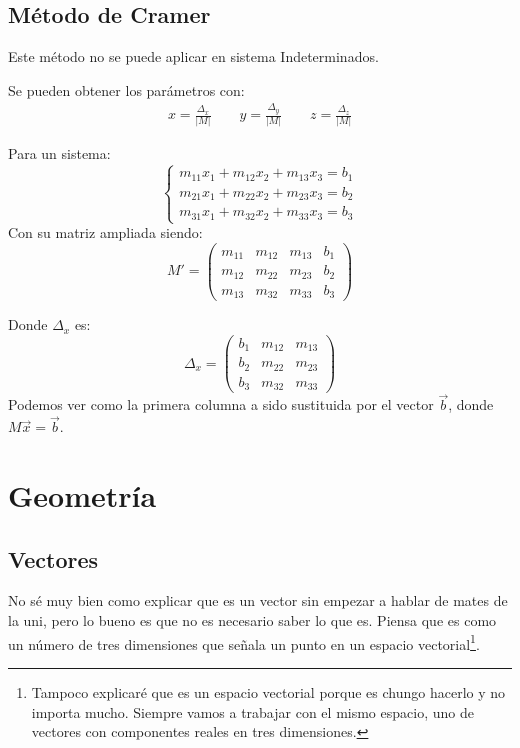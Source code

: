\documentclass[arial,a4paper,print]{article}
\begin{document}
\subsection{Método de Cramer}
Este método no se puede aplicar en sistema Indeterminados. 

Se pueden obtener los parámetros con:
\begin{align*}
	x = \frac{\Delta_{x}}{|M|} \qquad y = \frac{\Delta_{y}}{|M|} \qquad z = \frac{\Delta_{z}}{|M|} 
\end{align*}
 
Para un sistema:
\begin{equation*}
	\begin{cases}
		m_{11}x_{1} + m_{12}x_{2} + m_{13}x_{3} = b_{1} \\
		m_{21}x_{1} + m_{22}x_{2} + m_{23}x_{3} = b_{2} \\
		m_{31}x_{1} + m_{32}x_{2} + m_{33}x_{3} = b_{3} 
	\end{cases}
\end{equation*}
Con su matriz ampliada siendo:
\begin{equation*}
	M' = \left(\begin{array}{lll|l}
			m_{11} & m_{12} & m_{13} & b_{1}\\
			m_{12} & m_{22} & m_{23} & b_{2}\\
			m_{13} & m_{32} & m_{33} & b_{3}
	\end{array}\right)
\end{equation*}

Donde $\Delta_{x}$ es:
\begin{equation*}
	\Delta_{x} = \begin{pmatrix}
		b_{1} & m_{12} & m_{13} \\
		b_{2} & m_{22} & m_{23} \\
		b_{3} & m_{32} & m_{33} 
	\end{pmatrix}
\end{equation*}
Podemos ver como la primera columna a sido sustituida por el vector $\vec{b}$, donde $M\vec{x}=\vec{b}$.

\pagebreak

\section{Geometría}
\subsection{Vectores}
No sé muy bien como explicar que es un vector sin empezar a hablar de mates de la uni, pero lo bueno es que no es necesario saber lo que es. Piensa que es como un número de tres dimensiones que señala un punto en un espacio vectorial\footnote{Tampoco explicaré que es un espacio vectorial porque es chungo hacerlo y no importa mucho. Siempre vamos a trabajar con el mismo espacio, uno de vectores con componentes reales en tres dimensiones.}. 
\end{document}
